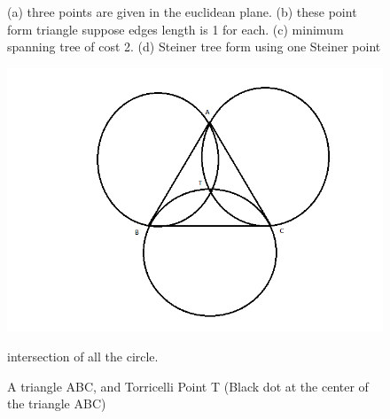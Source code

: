 \begin{figure}
\begin{subfigure}{.5\textwidth}
  \caption{}
  \label{fig:sub1}
\end{subfigure}%
\begin{subfigure}{.5\textwidth}
  \centering
  
  \caption{}
  \label{fig:sub2}
\end{subfigure}
\caption{(a) three points are given in the euclidean plane. (b) these point form triangle suppose edges length is 1 for each. (c) minimum spanning tree of cost 2. (d) Steiner tree form using one Steiner point}
\label{fig:test}
\end{figure}

 \begin{figure}
      \centering
    \includegraphics[scale = 0.8]{torr.png}
  \caption{A triangle ABC, and Torricelli Point T (Black dot at the center of the triangle ABC)} intersection of all the circle.
\end{figure}

